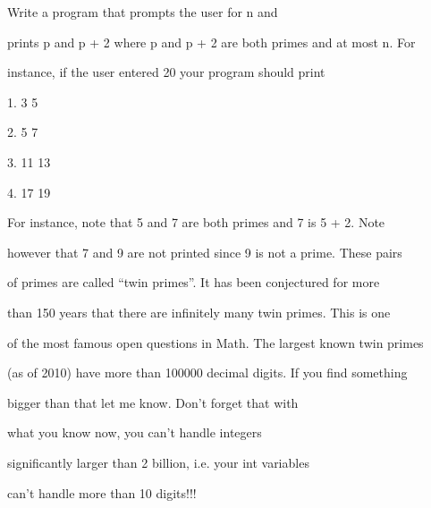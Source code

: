 Write a program that prompts the user for n and

prints p and p + 2 where p and p + 2 are both primes and at most n. For

instance, if the user entered 20 your program should print

\begin{console}

1. 3 5

2. 5 7

3. 11 13

4. 17 19

\end{console}

For instance, note that 5 and 7 are both primes and 7 is 5 + 2. Note

however that 7 and 9 are not printed since 9 is not a prime. These pairs

of primes are called ``twin primes''. It has been conjectured for more

than 150 years that there are infinitely many twin primes. This is one

of the most famous open questions in Math. The largest known twin primes

(as of 2010) have more than 100000 decimal digits. If you find something

bigger than that let me know. Don't forget that with

what you know now, you can't handle integers

significantly larger than 2 billion, i.e. your int variables

can't handle more than 10 digits!!!

